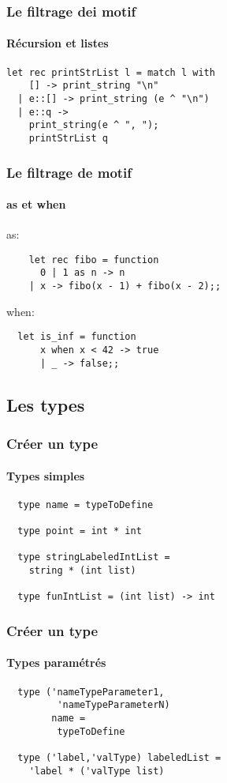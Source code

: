 \begin{frame}[fragile]
	\frametitle{Le filtrage dei motif}
	\framesubtitle{Récursion et listes}
		\begin{lstlisting}
let rec printStrList l = match l with
    [] -> print_string "\n"
  | e::[] -> print_string (e ^ "\n")
  | e::q -> 
    print_string(e ^ ", ");
    printStrList q
		\end{lstlisting}
\end{frame}

\begin{frame}[fragile]
  \frametitle{Le filtrage de motif}
	\framesubtitle{as et when}
  \begin{block}{as:}
    \begin{lstlisting}
	let rec fibo = function 
 	  0 | 1 as n -> n 
 	| x -> fibo(x - 1) + fibo(x - 2);; 
    \end{lstlisting}
  \end{block}
  \begin{block}{when:}
    \begin{lstlisting}
  let is_inf = function 
      x when x < 42 -> true
 	  | _ -> false;;
    \end{lstlisting}
  \end{block}
\end{frame}

\subsection{Les types} %
\begin{frame}[fragile]
	\frametitle{Créer un type}
	\framesubtitle{Types simples}
	\begin{lstlisting}
  type name = typeToDefine

  type point = int * int

  type stringLabeledIntList = 
    string * (int list)

  type funIntList = (int list) -> int
	\end{lstlisting}
\end{frame}

\begin{frame}[fragile]
	\frametitle{Créer un type}
	\framesubtitle{Types paramétrés}
	\begin{lstlisting}
  type ('nameTypeParameter1,
 	     'nameTypeParameterN) 
   	    name = 
         typeToDefine
    
  type ('label,'valType) labeledList =
    'label * ('valType list) 
	\end{lstlisting}
\end{frame}


